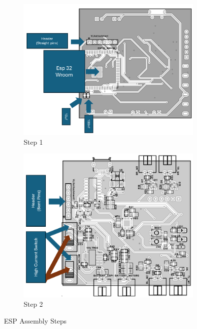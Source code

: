 \begin{figure}[H]
    \centering
    \begin{subfigure}[b]{0.4\textwidth}
        \centering
        \includegraphics[width=\textwidth]{img/assembly-1.png}
        \caption{Step 1}
    \end{subfigure}
    \hfill
    \begin{subfigure}[b]{0.4\textwidth}
        \centering
        \includegraphics[width=\textwidth]{img/assembly-2.png}
        \caption{Step 2}
    \end{subfigure}
    \caption{ESP Assembly Steps}
\end{figure}

